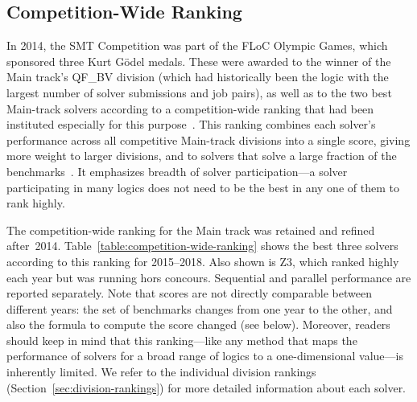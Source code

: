 \documentclass[dvipsnames,table,twoside,11pt]{article}
\begin{document}







\subsection{Competition-Wide Ranking}
\label{sec:floc}

In 2014, the SMT Competition was part of the FLoC Olympic Games, which
sponsored three Kurt G\"odel medals.  These were awarded to the winner
of the Main track's QF\_BV division (which had historically been the
logic with the largest number of solver submissions and job pairs), as
well as to the two best Main-track solvers according to a
competition-wide ranking that had been instituted especially for this
purpose~\cite{CDW14}.  This ranking combines each solver's performance
across all competitive Main-track divisions into a single score,
giving more weight to larger divisions, and to solvers that solve a
large fraction of the benchmarks~\cite{rules18}.  It emphasizes
breadth of solver participation---a solver participating in many
logics does not need to be the best in any one of them to rank highly.

The competition-wide ranking for the Main track was retained and
refined after~2014.  Table~\ref{table:competition-wide-ranking} shows
the best three solvers according to this ranking for 2015--2018.  Also
shown is Z3, which ranked highly each year but was running hors
concours.  Sequential and parallel performance are reported
separately.
%
Note that scores are not directly comparable between different years:
the set of benchmarks changes from one year to the other, and also the
formula to compute the score changed (see below).  Moreover, readers
should keep in mind that this ranking---like any method that maps the
performance of solvers for a broad range of logics to a
one-dimensional value---is inherently limited.  We refer to the
individual division rankings (Section~\ref{sec:division-rankings}) for
more detailed information about each solver.
\end{document}
